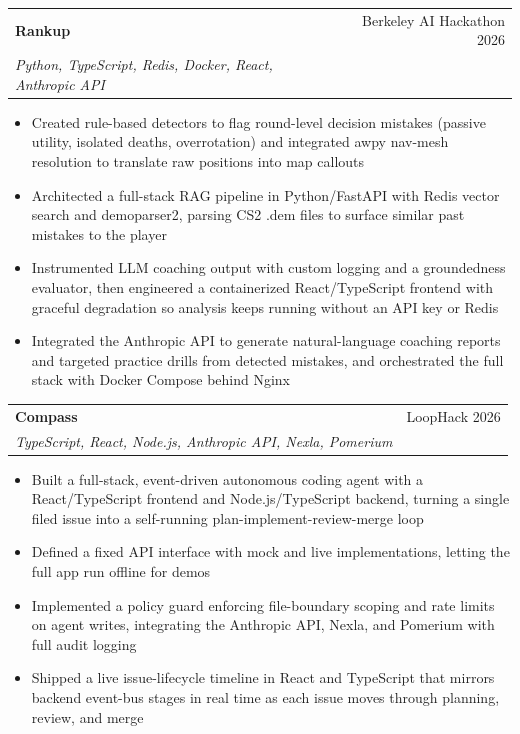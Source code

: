 \documentclass[letterpaper,10pt]{article}
\makeatletter
\newcommand{\resumeItem}[1]{
  \item\small{
    {#1 \vspace{-2pt}}
  }
}
\newcommand{\resumeItemListStart}{\begin{itemize}}
\newcommand{\resumeItemListEnd}{\end{itemize}\vspace{-5pt}}
\newcommand{\resumeProjectSubheading}[3]{
    \item
    \begin{tabular*}{0.97\textwidth}{l@{\extracolsep{\fill}}r}
      \small#1 & \small #3 \\
      \textit{\small #2} & \\
    \end{tabular*}\vspace{-7pt}
}
\makeatother
\begin{document}
      \resumeProjectSubheading
          {\textbf{Rankup}}
          {Python, TypeScript, Redis, Docker, React, Anthropic API}
          {Berkeley AI Hackathon 2026}
          \resumeItemListStart
            \resumeItem{Created rule-based detectors to flag round-level decision mistakes (passive utility, isolated deaths, overrotation) and integrated awpy nav-mesh resolution to translate raw positions into map callouts}
            \resumeItem{Architected a full-stack RAG pipeline in Python/FastAPI with Redis vector search and demoparser2, parsing CS2 .dem files to surface similar past mistakes to the player}
            \resumeItem{Instrumented LLM coaching output with custom logging and a groundedness evaluator, then engineered a containerized React/TypeScript frontend with graceful degradation so analysis keeps running without an API key or Redis}
            \resumeItem{Integrated the Anthropic API to generate natural-language coaching reports and targeted practice drills from detected mistakes, and orchestrated the full stack with Docker Compose behind Nginx}
          \resumeItemListEnd

      \resumeProjectSubheading
          {\textbf{Compass}}
          {TypeScript, React, Node.js, Anthropic API, Nexla, Pomerium}
          {LoopHack 2026}
          \resumeItemListStart
            \resumeItem{Built a full-stack, event-driven autonomous coding agent with a React/TypeScript frontend and Node.js/TypeScript backend, turning a single filed issue into a self-running plan-implement-review-merge loop}
            \resumeItem{Defined a fixed API interface with mock and live implementations, letting the full app run offline for demos}
            \resumeItem{Implemented a policy guard enforcing file-boundary scoping and rate limits on agent writes, integrating the Anthropic API, Nexla, and Pomerium with full audit logging}
            \resumeItem{Shipped a live issue-lifecycle timeline in React and TypeScript that mirrors backend event-bus stages in real time as each issue moves through planning, review, and merge}
          \resumeItemListEnd

\end{document}
